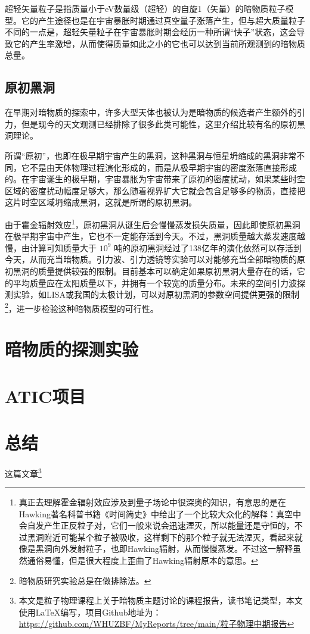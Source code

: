 \documentclass{ctexart}
\begin{document}
	超轻矢量粒子是指质量小于eV数量级（超轻）的自旋1（矢量）的暗物质粒子模型。它的产生途径也是在宇宙暴胀时期通过真空量子涨落产生，但与超大质量粒子不同的一点是，超轻矢量粒子在宇宙暴胀时期会经历一种所谓“快子”状态，这会导致它的产生率激增，从而使得质量如此之小的它也可以达到当前所观测到的暗物质总量。
	\subsection{原初黑洞}
	在早期对暗物质的探索中，许多大型天体也被认为是暗物质的候选者产生额外的引力，但是现今的天文观测已经排除了很多此类可能性，这里介绍比较有名的原初黑洞理论。
	
	所谓“原初”，也即在极早期宇宙产生的黑洞，这种黑洞与恒星坍缩成的黑洞非常不同，它不是由天体物理过程演化形成的，而是从极早期宇宙的密度涨落直接形成的。在宇宙诞生的极早期，宇宙暴胀为宇宙带来了原初的密度扰动，如果某些时空区域的密度扰动幅度足够大，那么随着视界扩大它就会包含足够多的物质，直接把这片时空区域坍缩成黑洞，这就是所谓的原初黑洞。
	
	由于霍金辐射效应\footnote{真正去理解霍金辐射效应涉及到量子场论中很深奥的知识，有意思的是在Hawking著名科普书籍《时间简史》中给出了一个比较大众化的解释：真空中会自发产生正反粒子对，它们一般来说会迅速湮灭，所以能量还是守恒的，不过黑洞附近可能某个粒子被吸收，这样剩下的那个粒子就无法湮灭，看起来就像是黑洞向外发射粒子，也即Hawking辐射，从而慢慢蒸发。不过这一解释虽然通俗易懂，但是很大程度上歪曲了Hawking辐射原本的意思。}，原初黑洞从诞生后会慢慢蒸发损失质量，因此即使原初黑洞在极早期宇宙中产生，它也不一定能存活到今天。不过，黑洞质量越大蒸发速度越慢，由计算可知质量大于 $10^9$ 吨的原初黑洞经过了138亿年的演化依然可以存活到今天，从而充当暗物质。引力波、引力透镜等实验可以对能够充当全部暗物质的原初黑洞的质量提供较强的限制。目前基本可以确定如果原初黑洞大量存在的话，它的平均质量应在太阳质量以下，并拥有一个较宽的质量分布。未来的空间引力波探测实验，如LISA或我国的太极计划，可以对原初黑洞的参数空间提供更强的限制\footnote{暗物质研究实验总是在做排除法。}，进一步检验这种暗物质模型的可行性。
	\section{暗物质的探测实验}
	
	
	\section{ATIC项目}
	
	
	
	\section{总结}
	这篇文章\footnote{本文是粒子物理课程上关于暗物质主题讨论的课程报告，读书笔记类型，本文使用\LaTeX 编写，项目Github地址为：\href{https://github.com/WHUZBF/MyReports/tree/main/粒子物理中期报告}{https://github.com/WHUZBF/MyReports/tree/main/粒子物理中期报告}}
	
	
	
	\nocite{*}
	
\end{document}
